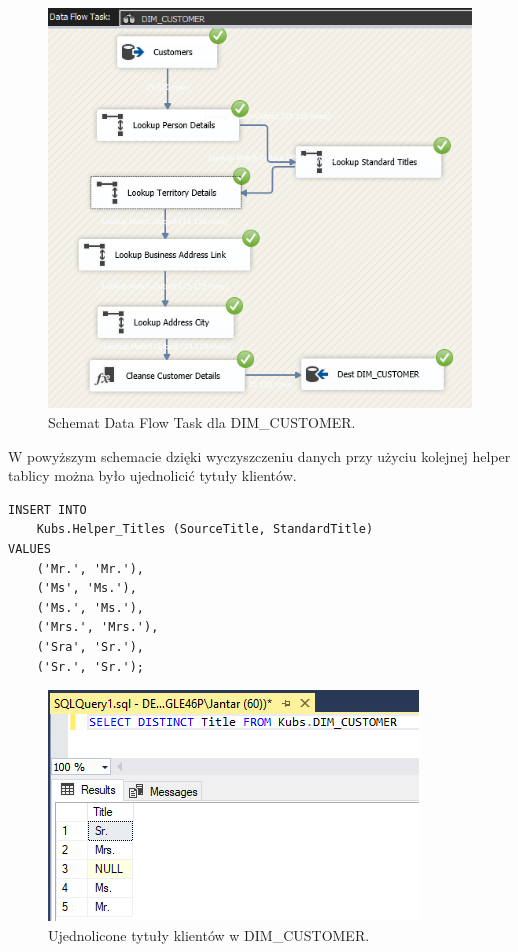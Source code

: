 \documentclass[a4paper,12pt]{article}
\begin{document}
\begin{figure}[H]
    \centering
    \includegraphics[width=\textwidth]{images/5_customer.png}
    \caption{Schemat Data Flow Task dla DIM\_CUSTOMER.}
    \label{fig:zad5_dft_other_dim}
\end{figure}

W powyższym schemacie dzięki wyczyszczeniu danych przy użyciu kolejnej helper tablicy można było ujednolicić tytuły klientów.

\begin{lstlisting}
INSERT INTO
    Kubs.Helper_Titles (SourceTitle, StandardTitle)
VALUES
    ('Mr.', 'Mr.'),
    ('Ms', 'Ms.'),
    ('Ms.', 'Ms.'),
    ('Mrs.', 'Mrs.'),
    ('Sra', 'Sr.'),
    ('Sr.', 'Sr.');
\end{lstlisting}

\begin{figure}[H]
    \centering
    \includegraphics[width=\textwidth]{images/5_lookup_fix.png}
    \caption{Ujednolicone tytuły klientów w DIM\_CUSTOMER.}
    \label{fig:zad5_dft_other_dim_fixed}
\end{figure}
\end{document}
